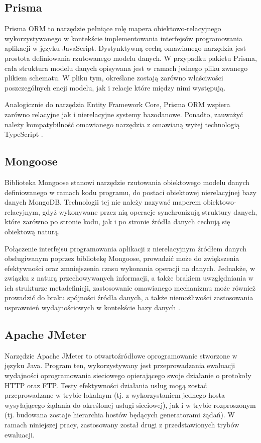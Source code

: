 \subsection*{Prisma}
Prisma ORM to narzędzie pełniące rolę mapera obiektowo-relacyjnego wykorzystywanego w kontekście implementowania interfejsów programowania aplikacji w języku JavaScript. Dystynktywną cechą omawianego narzędzia jest prostota definiowania rzutowanego modelu danych. W przypadku pakietu Prisma, cała struktura modelu danych opisywana jest w ramach jednego pliku zwanego plikiem schematu. W pliku tym, określane zostają zarówno właściwości poszczególnych encji modelu, jak i relacje które między nimi występują.

Analogicznie do narzędzia Entity Framework Core, Prisma ORM wspiera zarówno relacyjne jak i nierelacyjne systemy bazodanowe. Ponadto, zauważyć należy kompatybilność omawianego narzędzia z omawianą wyżej technologią TypeScript \cite{prisma}.
\subsection*{Mongoose}
Biblioteka Mongoose stanowi narzędzie rzutowania obiektowego modelu danych definiowanego w ramach kodu programu, do postaci obiektowej nierelacyjnej bazy danych MongoDB. Technologii tej nie należy nazywać maperem obiektowo-relacyjnym, gdyż wykonywane przez nią operacje synchronizują struktury danych, które zarówno po stronie kodu, jak i po stronie źródła danych cechują się obiektową naturą.

Połączenie interfejsu programowania aplikacji z nierelacyjnym źródłem danych obsługiwanym poprzez bibliotekę Mongoose, prowadzić może do zwiększenia efektywności oraz zmniejszenia czasu wykonania operacji na danych. Jednakże, w związku z naturą przechowywanych informacji, a także brakiem uwzględniania w ich strukturze metadefinicji, zastosowanie omawianego mechanizmu może również prowadzić do braku spójności źródła danych, a także niemożliwości zastosowania usprawnień wydajnościowych w kontekście bazy danych \cite{holmes2013mongoose}.  
\subsection*{Apache JMeter}
Narzędzie Apache JMeter to otwartoźródłowe oprogramowanie stworzone w języku Java. Program ten, wykorzystywany jest przeprowadzania ewaluacji wydajności oprogramowania sieciowego opierającego swoje działanie o protokoły HTTP oraz FTP. Testy efektywności działania usług mogą zostać przeprowadzane w trybie lokalnym (tj. z wykorzystaniem jednego hosta wysyłającego żądania do określonej usługi sieciowej), jak i w trybie rozproszonym (tj. budowana zostaje hierarchia hostów będących generatorami żądań). W ramach niniejszej pracy, zastosowany został drugi z przedstawionych trybów ewaluacji.

